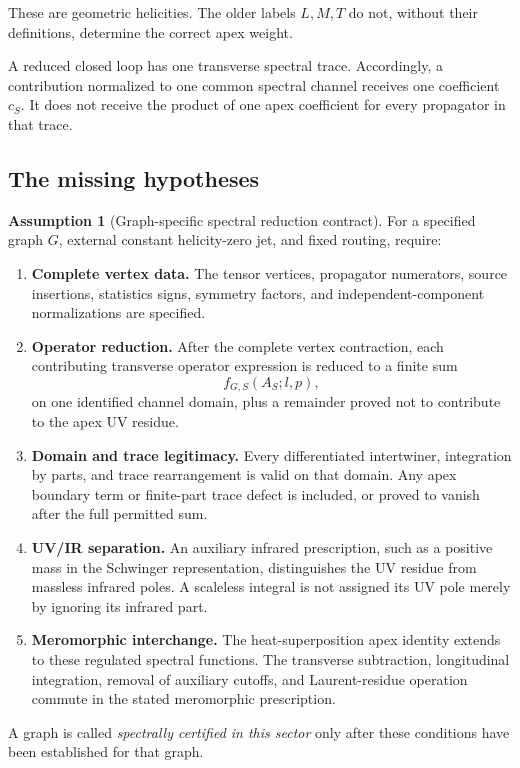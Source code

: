 \documentclass[11pt,a4paper]{article}
\theoremstyle{plain}
\theoremstyle{definition}
\newtheorem{assumption}[theorem]{Assumption}
\theoremstyle{remark}
\numberwithin{equation}{section}
\begin{document}
These are geometric helicities. The older labels \(L,M,T\) do not,
without their definitions, determine the correct apex weight.

A reduced closed loop has one transverse spectral trace.
Accordingly, a contribution normalized to one common spectral
channel receives one coefficient \(c_S\).
It does not receive the product of one apex coefficient for every
propagator in that trace.

\subsection{The missing hypotheses}

\begin{assumption}[Graph-specific spectral reduction contract]
\label{ass:reduction}
For a specified graph \(G\), external constant helicity-zero jet,
and fixed routing, require:
\begin{enumerate}[label=\textup{(R\arabic*)}]
\item \textbf{Complete vertex data.}
The tensor vertices, propagator numerators, source insertions,
statistics signs, symmetry factors, and independent-component
normalizations are specified.

\item \textbf{Operator reduction.}
After the complete vertex contraction, each contributing transverse
operator expression is reduced to a finite sum
\[
f_{G,S}(A_S;l,p),
\]
on one identified channel domain, plus a remainder proved not
to contribute to the apex UV residue.

\item \textbf{Domain and trace legitimacy.}
Every differentiated intertwiner, integration by parts, and trace
rearrangement is valid on that domain.
Any apex boundary term or finite-part trace defect is included,
or proved to vanish after the full permitted sum.

\item \textbf{UV/IR separation.}
An auxiliary infrared prescription, such as a positive mass in
the Schwinger representation, distinguishes the UV residue
from massless infrared poles.
A scaleless integral is not assigned its UV pole merely by
ignoring its infrared part.

\item \textbf{Meromorphic interchange.}
The heat-superposition apex identity extends to these regulated
spectral functions. The transverse subtraction, longitudinal
integration, removal of auxiliary cutoffs, and Laurent-residue
operation commute in the stated meromorphic prescription.
\end{enumerate}
A graph is called \emph{spectrally certified in this sector}
only after these conditions have been established for that graph.
\end{assumption}
\end{document}

